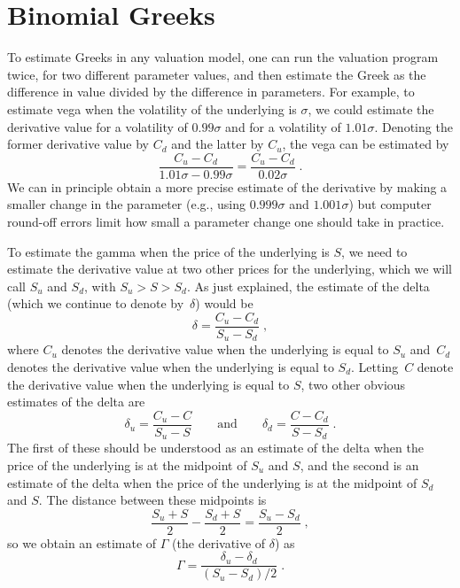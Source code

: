 \section{Binomial Greeks}\label{s_binomial_greeks}

To estimate Greeks in any valuation model, one can run the valuation program twice, for two different parameter values, and then estimate the Greek as the difference in value divided by the difference in parameters.   For example, to estimate vega when the volatility of the underlying is $\sigma$, we could estimate the derivative value for a volatility of $0.99\sigma$ and for a volatility of $1.01\sigma$.  Denoting the former derivative value by $C_d$ and the latter by $C_u$, the vega can be estimated by 
$$\frac{C_u-C_d}{1.01\sigma-0.99\sigma} = \frac{C_u-C_d}{0.02\sigma}\; .$$  We can in principle obtain a more precise estimate of the derivative by making a smaller change in the parameter (e.g., using $0.999\sigma$ and $1.001\sigma$) but computer round-off errors limit how small a parameter change one should take in practice.  

To estimate the gamma when the price of the underlying is $S$, we need to estimate the derivative value at two other prices for the underlying, which we will call $S_u$ and $S_d$, with  $S_u>S>S_d$.  As just explained, the estimate of the delta (which we continue to denote by~$\delta$) would be
\begin{equation}\label{binomialdelta100}
\delta = \frac{C_u-C_d}{S_u-S_d}\;,
\end{equation}
where $C_u$ denotes the derivative value when the underlying is equal to $S_u$ and~$C_d$ denotes the derivative value when the underlying is equal to $S_d$.
Letting~$C$ denote the derivative value when the underlying is equal to $S$, two other obvious estimates of the delta are
$$\delta_u = \frac{C_u-C}{S_u-S} \qquad \text{and} \qquad \delta_d = \frac{C-C_d}{S-S_d}\; .$$
The first of these should be understood as an estimate of the delta when the price of the underlying is at the midpoint of $S_u$ and $S$, and the second is an estimate of the delta when the price of the underlying is at the midpoint of $S_d$ and $S$.  The distance between these midpoints is 
$$\frac{S_u+S}{2} - \frac{S_d+S}{2} = \frac{S_u-S_d}{2}\; ,$$ so we obtain an estimate of $\Gamma$ (the derivative of $\delta$) as
\begin{equation}\label{binomialgamma100}
\Gamma = \frac{\delta_u-\delta_d}{(S_u-S_d)/2}\;.
\end{equation}


